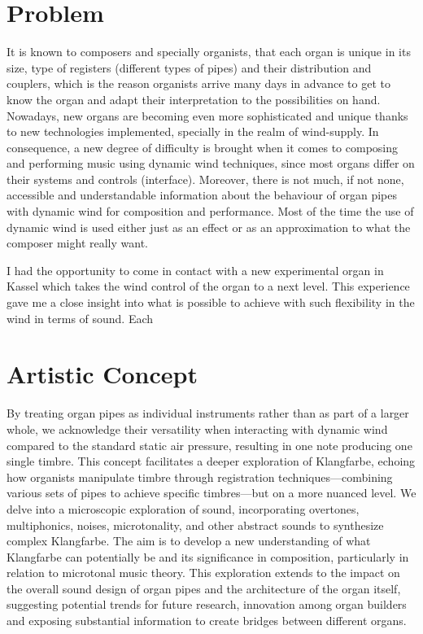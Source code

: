 
\section{Problem}

It is known to composers and specially organists, that each organ is unique in its size, type of registers (different types of pipes) and their distribution and couplers, which is the reason organists arrive many days in advance to get to know the organ and adapt their interpretation to the possibilities on hand. Nowadays, new organs are becoming even more sophisticated and unique thanks to new technologies implemented, specially in the realm of wind-supply. In consequence, a new degree of difficulty is brought when it comes to composing and performing music using dynamic wind techniques, since most organs differ on their systems and controls (interface). Moreover, there is not much, if not none, accessible and understandable information about the behaviour of organ pipes with dynamic wind for composition and performance. Most of the time the use of dynamic wind is used either just as an effect or as an approximation to what the composer might really want. 

I had the opportunity to come in contact with a new experimental organ in Kassel which takes the wind control of the organ to a next level. This experience gave me a close insight into what is possible to achieve with such flexibility in the wind in terms of sound. Each


\section{Artistic Concept}

By treating organ pipes as individual instruments rather than as part of a larger whole, we acknowledge their versatility when interacting with dynamic wind compared to the standard static air pressure, resulting in one note producing one single timbre. This concept facilitates a deeper exploration of Klangfarbe, echoing how organists manipulate timbre through registration techniques—combining various sets of pipes to achieve specific timbres—but on a more nuanced level. We delve into a microscopic exploration of sound, incorporating overtones, multiphonics, noises, microtonality, and other abstract sounds to synthesize complex Klangfarbe. The aim is to develop a new understanding of what Klangfarbe can potentially be and its significance in composition, particularly in relation to microtonal music theory. This exploration extends to the impact on the overall sound design of organ pipes and the architecture of the organ itself, suggesting potential trends for future research, innovation among organ builders and exposing substantial information to create bridges between different organs. 

